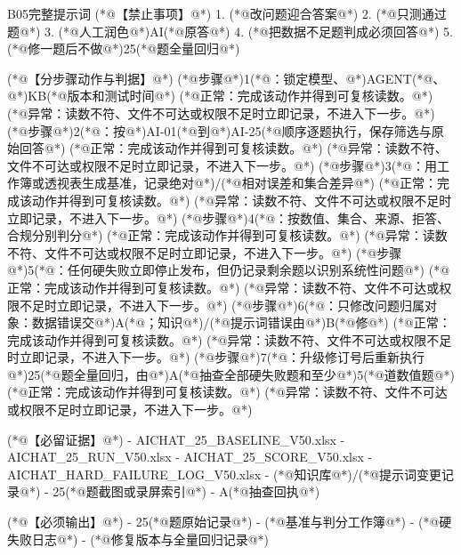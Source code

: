 \documentclass[UTF8,openany,zihao=-4]{ctexbook}
\renewcommand{\_}{\textunderscore\allowbreak}
\begin{document}
\begin{PromptBox}{B05完整提示词}
(*@{\promptcjk 【禁止事项】}@*)
1. (*@{\promptcjk 改问题迎合答案}@*)
2. (*@{\promptcjk 只测通过题}@*)
3. (*@{\promptcjk 人工润色}@*)AI(*@{\promptcjk 原答}@*)
4. (*@{\promptcjk 把数据不足题判成必须回答}@*)
5. (*@{\promptcjk 修一题后不做}@*)25(*@{\promptcjk 题全量回归}@*)

(*@{\promptcjk 【分步骤动作与判据】}@*)
(*@{\promptcjk 步骤}@*)1(*@{\promptcjk ：锁定模型、}@*)AGENT(*@{\promptcjk 、}@*)KB(*@{\promptcjk 版本和测试时间}@*)
  (*@{\promptcjk 正常：完成该动作并得到可复核读数。}@*)
  (*@{\promptcjk 异常：读数不符、文件不可达或权限不足时立即记录，不进入下一步。}@*)
(*@{\promptcjk 步骤}@*)2(*@{\promptcjk ：按}@*)AI-01(*@{\promptcjk 到}@*)AI-25(*@{\promptcjk 顺序逐题执行，保存筛选与原始回答}@*)
  (*@{\promptcjk 正常：完成该动作并得到可复核读数。}@*)
  (*@{\promptcjk 异常：读数不符、文件不可达或权限不足时立即记录，不进入下一步。}@*)
(*@{\promptcjk 步骤}@*)3(*@{\promptcjk ：用工作簿或透视表生成基准，记录绝对}@*)/(*@{\promptcjk 相对误差和集合差异}@*)
  (*@{\promptcjk 正常：完成该动作并得到可复核读数。}@*)
  (*@{\promptcjk 异常：读数不符、文件不可达或权限不足时立即记录，不进入下一步。}@*)
(*@{\promptcjk 步骤}@*)4(*@{\promptcjk ：按数值、集合、来源、拒答、合规分别判分}@*)
  (*@{\promptcjk 正常：完成该动作并得到可复核读数。}@*)
  (*@{\promptcjk 异常：读数不符、文件不可达或权限不足时立即记录，不进入下一步。}@*)
(*@{\promptcjk 步骤}@*)5(*@{\promptcjk ：任何硬失败立即停止发布，但仍记录剩余题以识别系统性问题}@*)
  (*@{\promptcjk 正常：完成该动作并得到可复核读数。}@*)
  (*@{\promptcjk 异常：读数不符、文件不可达或权限不足时立即记录，不进入下一步。}@*)
(*@{\promptcjk 步骤}@*)6(*@{\promptcjk ：只修改问题归属对象：数据错误交}@*)A(*@{\promptcjk ；知识}@*)/(*@{\promptcjk 提示词错误由}@*)B(*@{\promptcjk 修}@*)
  (*@{\promptcjk 正常：完成该动作并得到可复核读数。}@*)
  (*@{\promptcjk 异常：读数不符、文件不可达或权限不足时立即记录，不进入下一步。}@*)
(*@{\promptcjk 步骤}@*)7(*@{\promptcjk ：升级修订号后重新执行}@*)25(*@{\promptcjk 题全量回归，由}@*)A(*@{\promptcjk 抽查全部硬失败题和至少}@*)5(*@{\promptcjk 道数值题}@*)
  (*@{\promptcjk 正常：完成该动作并得到可复核读数。}@*)
  (*@{\promptcjk 异常：读数不符、文件不可达或权限不足时立即记录，不进入下一步。}@*)

(*@{\promptcjk 【必留证据】}@*)
- AICHAT_25_BASELINE_V50.xlsx
- AICHAT_25_RUN_V50.xlsx
- AICHAT_25_SCORE_V50.xlsx
- AICHAT_HARD_FAILURE_LOG_V50.xlsx
- (*@{\promptcjk 知识库}@*)/(*@{\promptcjk 提示词变更记录}@*)
- 25(*@{\promptcjk 题截图或录屏索引}@*)
- A(*@{\promptcjk 抽查回执}@*)

(*@{\promptcjk 【必须输出】}@*)
- 25(*@{\promptcjk 题原始记录}@*)
- (*@{\promptcjk 基准与判分工作簿}@*)
- (*@{\promptcjk 硬失败日志}@*)
- (*@{\promptcjk 修复版本与全量回归记录}@*)


\end{PromptBox}
\end{document}
